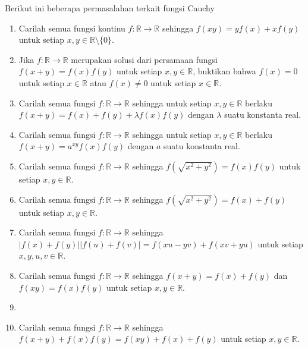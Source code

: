 \documentclass{article}
\begin{document}
Berikut ini beberapa permasalahan terkait fungsi Cauchy
\begin{enumerate}
\item Carilah semua fungsi kontinu $f : \mathbb{R} \rightarrow \mathbb{R}$ sehingga $f(xy) = y f(x) + x f(y)$ untuk setiap $x, y \in \mathbb{R} \setminus \{0\}$.
\item Jika $f : \mathbb{R} \rightarrow \mathbb{R}$ merupakan solusi dari persamaan fungsi $f(x+y) = f(x)f(y)$ untuk setiap $x, y \in \mathbb{R}$, buktikan bahwa $f(x) = 0$ untuk setiap $x \in \mathbb{R}$ atau $f(x) \ne 0$ untuk setiap $x \in \mathbb{R}$.
\item Carilah semua fungsi $f : \mathbb{R} \rightarrow \mathbb{R}$ sehingga untuk setiap $x, y \in \mathbb{R}$ berlaku $f(x+y) = f(x) + f(y) + \lambda f(x)f(y)$ dengan $\lambda$ suatu konstanta real.
\item Carilah semua fungsi $f : \mathbb{R} \rightarrow \mathbb{R}$ sehingga untuk setiap $x, y \in \mathbb{R}$ berlaku $f(x+y) = a^{xy} f(x) f(y)$ dengan $a$ suatu konstanta real.
\item Carilah semua fungsi $f : \mathbb{R} \rightarrow \mathbb{R}$ sehingga $f\left(\sqrt{x^2+y^2}\right) = f(x)f(y)$ untuk setiap $x, y \in \mathbb{R}$.
\item Carilah semua fungsi $f : \mathbb{R} \rightarrow \mathbb{R}$ sehingga $f\left(\sqrt{x^2+y^2}\right) = f(x)+f(y)$ untuk setiap $x, y \in \mathbb{R}$.
\end{enumerate}



\begin{enumerate}
\setcounter{enumi}{6}
\item Carilah semua fungsi $f : \mathbb{R} \rightarrow \mathbb{R}$ sehingga $\vert{}f(x)+f(y)\vert{}\vert{}f(u)+f(v)\vert{} = f(xu-yv) + f(xv+yu)$ untuk setiap $x, y, u, v \in \mathbb{R}$.
\item Carilah semua fungsi $f : \mathbb{R} \rightarrow \mathbb{R}$ sehingga $f(x+y) = f(x)+f(y)$ dan $f(xy) = f(x)f(y)$ untuk setiap $x, y \in \mathbb{R}$.
\item
\item Carilah semua fungsi $f : \mathbb{R} \rightarrow \mathbb{R}$ sehingga $f(x+y)+f(x)f(y) = f(xy)+f(x)+f(y)$ untuk setiap $x, y \in \mathbb{R}$.
\end{enumerate}
\end{document}
